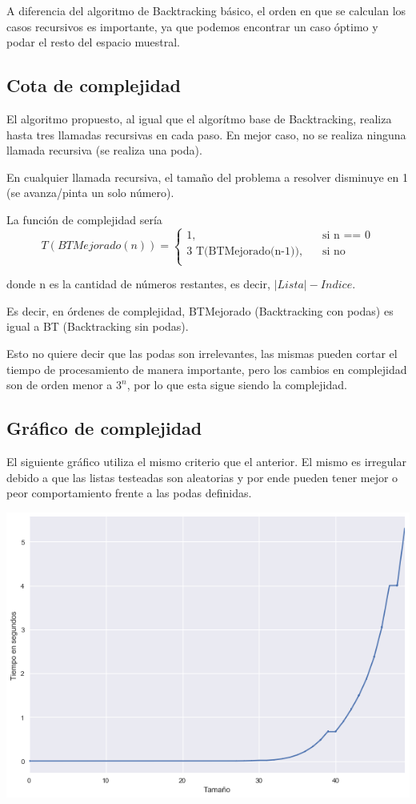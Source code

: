 	A diferencia del algoritmo de Backtracking básico, el orden en que se calculan los casos recursivos es importante, ya que podemos encontrar un caso óptimo y podar el resto del espacio muestral.

	\subsection{Cota de complejidad}

	El algoritmo propuesto, al igual que el algorítmo base de Backtracking, realiza hasta tres llamadas recursivas en cada paso. En mejor caso, no se realiza ninguna llamada recursiva (se realiza una poda).

	En cualquier llamada recursiva, el tamaño del problema a resolver disminuye en 1 (se avanza/pinta un solo número).

	La función de complejidad sería
	\[
	T(BTMejorado(n)) =
		\begin{cases}
			\text{1,} &\quad\text{si n == 0}\\
			\text{3 T(BTMejorado(n-1)),} &\quad\text{si no} \\
		\end{cases}
	\]

	donde n es la cantidad de números restantes, es decir, $|Lista| - Indice$.

	Es decir, en órdenes de complejidad, BTMejorado (Backtracking con podas) es igual a BT (Backtracking sin podas).

	Esto no quiere decir que las podas son irrelevantes, las mismas pueden cortar el tiempo de procesamiento de manera importante, pero los cambios en complejidad son de orden menor a $3^n$, por lo que esta sigue siendo la complejidad.

	\pagebreak
	\subsection{Gráfico de complejidad}

	El siguiente gráfico utiliza el mismo criterio que el anterior. El mismo es irregular debido a que las listas testeadas son aleatorias y por ende pueden tener mejor o peor comportamiento frente a las podas definidas.

	\begin{center}
	\includegraphics[width=.8\textwidth]{ej2.png}
	\end{center}

